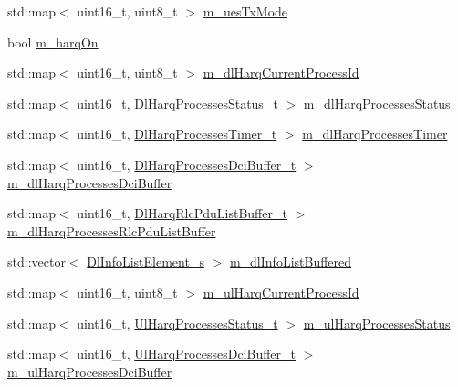 \begin{DoxyCompactItemize}
std\+::map$<$ uint16\+\_\+t, uint8\+\_\+t $>$ \hyperlink{classns3_1_1TdBetFfMacScheduler_a4488d2d9dc706b42ef06e493332042cd}{m\+\_\+ues\+Tx\+Mode}
\item 
bool \hyperlink{classns3_1_1TdBetFfMacScheduler_a8de90c082c621bf8d664fff8cf370acb}{m\+\_\+harq\+On}
\item 
std\+::map$<$ uint16\+\_\+t, uint8\+\_\+t $>$ \hyperlink{classns3_1_1TdBetFfMacScheduler_ac0ed078aaa3bb69134023425a66ff84a}{m\+\_\+dl\+Harq\+Current\+Process\+Id}
\item 
std\+::map$<$ uint16\+\_\+t, \hyperlink{namespacens3_a457b3571b67ff17d042e9894e90e2ce2}{Dl\+Harq\+Processes\+Status\+\_\+t} $>$ \hyperlink{classns3_1_1TdBetFfMacScheduler_af9f2ffd80c6d473a5ccee8fb153d40f6}{m\+\_\+dl\+Harq\+Processes\+Status}
\item 
std\+::map$<$ uint16\+\_\+t, \hyperlink{namespacens3_a39413ade536de4b1c82d6c0074cc703e}{Dl\+Harq\+Processes\+Timer\+\_\+t} $>$ \hyperlink{classns3_1_1TdBetFfMacScheduler_a6421f37924ac8b08b528aec9e7386678}{m\+\_\+dl\+Harq\+Processes\+Timer}
\item 
std\+::map$<$ uint16\+\_\+t, \hyperlink{namespacens3_af25599bf8f9f564075c005759c9af18c}{Dl\+Harq\+Processes\+Dci\+Buffer\+\_\+t} $>$ \hyperlink{classns3_1_1TdBetFfMacScheduler_a94ed0382052c7b9665c5f04bce88fe6e}{m\+\_\+dl\+Harq\+Processes\+Dci\+Buffer}
\item 
std\+::map$<$ uint16\+\_\+t, \hyperlink{namespacens3_a4c0cbd1e72f1c667f8b5879655f13210}{Dl\+Harq\+Rlc\+Pdu\+List\+Buffer\+\_\+t} $>$ \hyperlink{classns3_1_1TdBetFfMacScheduler_a066bceddaca3ed4a25974ada3aba3028}{m\+\_\+dl\+Harq\+Processes\+Rlc\+Pdu\+List\+Buffer}
\item 
std\+::vector$<$ \hyperlink{structns3_1_1DlInfoListElement__s}{Dl\+Info\+List\+Element\+\_\+s} $>$ \hyperlink{classns3_1_1TdBetFfMacScheduler_ad28a9447cadd7f80c4fe5d3801d8828b}{m\+\_\+dl\+Info\+List\+Buffered}
\item 
std\+::map$<$ uint16\+\_\+t, uint8\+\_\+t $>$ \hyperlink{classns3_1_1TdBetFfMacScheduler_a0776a2fc3f7186d7ec4491dc21706596}{m\+\_\+ul\+Harq\+Current\+Process\+Id}
\item 
std\+::map$<$ uint16\+\_\+t, \hyperlink{namespacens3_af765c4daaafe4ea4809c1041fc196629}{Ul\+Harq\+Processes\+Status\+\_\+t} $>$ \hyperlink{classns3_1_1TdBetFfMacScheduler_a41bae8c97c560b2a314650d7e99bd356}{m\+\_\+ul\+Harq\+Processes\+Status}
\item 
std\+::map$<$ uint16\+\_\+t, \hyperlink{namespacens3_a042cbd6bf67e73911cba35b8c070223d}{Ul\+Harq\+Processes\+Dci\+Buffer\+\_\+t} $>$ \hyperlink{classns3_1_1TdBetFfMacScheduler_a24641ddb697d45df50ee7bcaaacdb1e1}{m\+\_\+ul\+Harq\+Processes\+Dci\+Buffer}

\end{DoxyCompactItemize}
